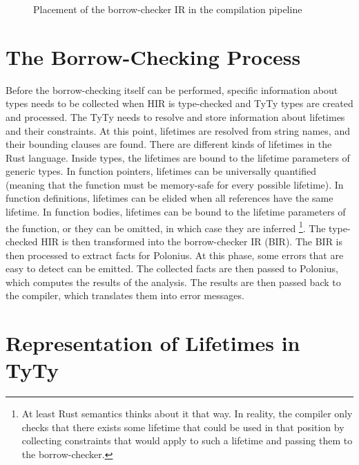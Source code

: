 \documentclass[
  11pt,
]{report}
\begin{document}
\begin{figure}
\centering

\caption{Placement of the borrow-checker IR in the compilation pipeline}
\end{figure}

\section{The Borrow-Checking Process}\label{the-borrow-checking-process}

Before the borrow-checking itself can be performed, specific information
about types needs to be collected when HIR is type-checked and TyTy
types are created and processed. The TyTy needs to resolve and store
information about lifetimes and their constraints. At this point,
lifetimes are resolved from string names, and their bounding clauses are
found. There are different kinds of lifetimes in the Rust language.
Inside types, the lifetimes are bound to the lifetime parameters of
generic types. In function pointers, lifetimes can be universally
quantified (meaning that the function must be memory-safe for every
possible lifetime). In function definitions, lifetimes can be elided
when all references have the same lifetime. In function bodies,
lifetimes can be bound to the lifetime parameters of the function, or
they can be omitted, in which case they are inferred \footnote{At least
  Rust semantics thinks about it that way. In reality, the compiler only
  checks that there exists some lifetime that could be used in that
  position by collecting constraints that would apply to such a lifetime
  and passing them to the borrow-checker.}. The type-checked HIR is then
transformed into the borrow-checker IR (BIR). The BIR is then processed
to extract facts for Polonius. At this phase, some errors that are easy
to detect can be emitted. The collected facts are then passed to
Polonius, which computes the results of the analysis. The results are
then passed back to the compiler, which translates them into error
messages.

\section{Representation of Lifetimes in
TyTy}\label{representation-of-lifetimes-in-tyty}
\end{document}
